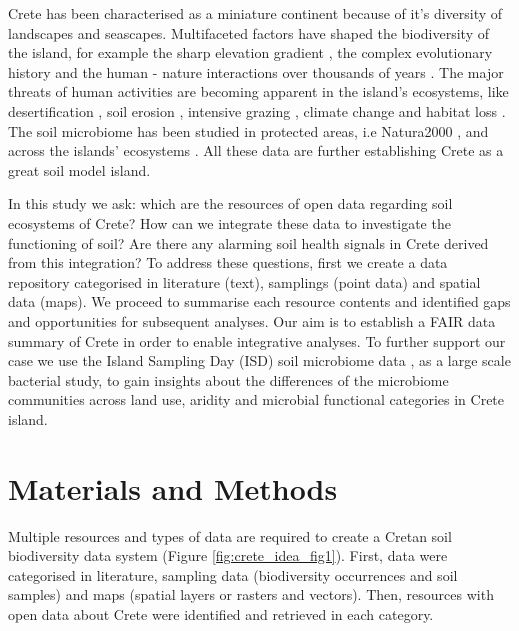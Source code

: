 \documentclass[a4paper,12pt]{article}
\begin{document}
Crete has been characterised as a miniature continent \parencite{Vogiatzakis2008_crete} because 
of it's diversity of landscapes and seascapes.
Multifaceted factors have shaped the
biodiversity of the island, for example the sharp elevation gradient \parencite{trigas2013, FAZAN2017},
the complex evolutionary history \parencite{POULAKAKIS2002} and the human - nature
interactions over thousands of years \parencite{Vogiatzakis2008_med, Sfenthourakis2017}.
The major threats of human activities are becoming apparent in the island's ecosystems,
like desertification \parencite{KARAMESOUTI2018266}, soil erosion \parencite{panagos2014seasonal}, intensive grazing \parencite{JouffroyBapicot2016},
climate change \parencite{Kougioumoutzis2020,Vogiatzakis2016} and habitat loss \parencite{ISPIKOUDIS1993259}.
The soil microbiome has been studied in protected areas,
i.e Natura2000 \parencite{bekris2019do-genetic}, and across the islands' ecosystems \parencite{holm2025first}.
All these data are further establishing Crete as a great soil model island.

In this study we ask: which are the resources of open data regarding soil ecosystems of Crete?
How can we integrate these data to investigate the functioning of soil?
Are there any alarming soil health signals in Crete derived from this integration?
To address these questions, first we create a data repository categorised in 
literature (text), samplings (point data) and spatial data (maps). 
We proceed to summarise each resource contents and
identified gaps and opportunities for subsequent analyses.
Our aim is to establish a FAIR data summary of Crete in order to enable integrative analyses.
To further support our case we use the
Island Sampling Day (ISD) soil microbiome data \parencite{holm2025first},
as a large scale bacterial study, to gain insights about the differences of the
microbiome communities across land use, aridity and microbial functional categories in Crete island.

\section{Materials and Methods}\label{integration_methods}

Multiple resources and types of data are required to create
a Cretan soil biodiversity data system (Figure \ref{fig:crete_idea_fig1}). 
First, data were categorised in literature, sampling data (biodiversity occurrences and soil samples)
and maps (spatial layers or rasters and vectors).
Then, resources with open data about Crete were identified and retrieved in each category.
\end{document}
